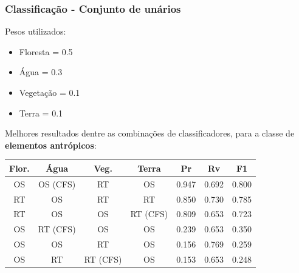 \documentclass[t]{beamer}
\begin{document}
\begin{frame}[c]
	\frametitle{Classificação - Conjunto de unários}

	Pesos utilizados:
	\begin{itemize}
		\item Floresta = 0.5
		\item Água = 0.3
		\item Vegetação = 0.1
		\item Terra = 0.1
	\end{itemize}

	Melhores resultados dentre as combinações de classificadores, para a classe de \textbf{elementos antrópicos}:

	\small{
		\begin{table}[h]
		\centering
		\begin{tabulary}{\linewidth}{|C|C|C|C|C|C|C|}
		\hline
		\textbf{Flor.} & \textbf{Água} & \textbf{Veg.} & \textbf{Terra} & \textbf{Pr} & \textbf{Rv} & \textbf{F1} \\ \hline
		OS & OS (CFS) & RT       & OS       & 0.947 & 0.692 & 0.800 \\ \hline
		RT & OS       & RT       & RT       & 0.850 & 0.730 & 0.785 \\ \hline
		RT & OS       & OS       & RT (CFS) & 0.809 & 0.653 & 0.723 \\ \hline
		OS & RT (CFS) & OS       & OS       & 0.239 & 0.653 & 0.350 \\ \hline
		OS & OS       & RT       & OS       & 0.156 & 0.769 & 0.259 \\ \hline
		OS & RT       & RT (CFS) & OS       & 0.153 & 0.653 & 0.248 \\ \hline
		\end{tabulary}
		\end{table}
	}

\end{frame}
\end{document}

